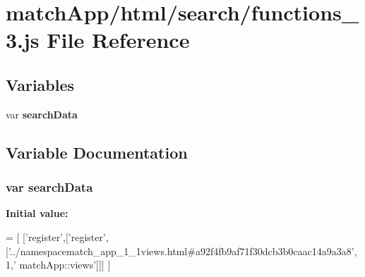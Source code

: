 \section{match\+App/html/search/functions\+\_\+3.js File Reference}
\label{functions__3_8js}
\subsection*{Variables}
\begin{DoxyCompactItemize}
\item 
var {\bf search\+Data}
\end{DoxyCompactItemize}


\subsection{Variable Documentation}
\subsubsection[{search\+Data}]{\setlength{\rightskip}{0pt plus 5cm}var search\+Data}\label{functions__3_8js_ad01a7523f103d6242ef9b0451861231e}
{\bfseries Initial value\+:}
\begin{DoxyCode}
=
[
  [\textcolor{stringliteral}{'register'},[\textcolor{stringliteral}{'register'},[\textcolor{stringliteral}{'../namespacematch\_app\_1\_1views.html#a92f4fb9af71f30dcb3b0caac14a9a3a8'},1,\textcolor{stringliteral}{'
      matchApp::views'}]]]
]
\end{DoxyCode}
